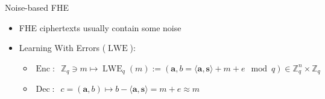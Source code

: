 \documentclass[aspectratio=169]{beamer}
\begin{document}
\begin{frame}{Noise-based FHE}
    \begin{itemize}
        \item FHE ciphertexts usually contain some noise 
    \end{itemize}
    
    \begin{itemize}
        \item Learning With Errors ($\operatorname{LWE}$): 
        \begin{itemize}
            \item $\operatorname{Enc}: \;\; \mathbb{Z}_q \ni m \mapsto \operatorname{LWE}_q (m) := (\mathbf{a}, b = \langle \mathbf{a}, \mathbf{s} \rangle + m + e \mod q) \in \mathbb{Z}_q^n \times \mathbb{Z}_q$ 
            \item $\operatorname{Dec}: \;\; c = (\mathbf{a}, b) \mapsto b - \langle \mathbf{a}, \mathbf{s} \rangle = m + e \approx m$
        \end{itemize}
    \end{itemize}

\end{frame}
\end{document}
